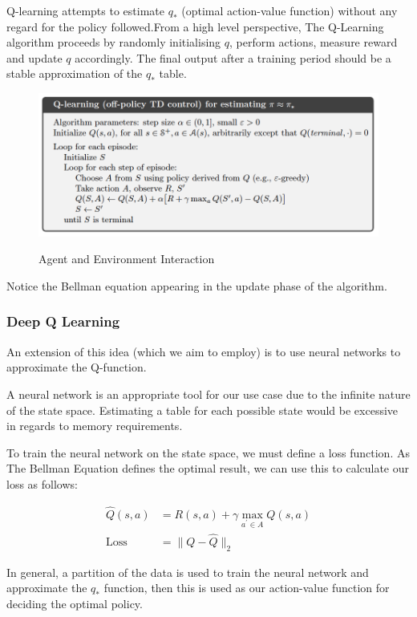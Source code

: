 \documentclass[12pt, authoryear]{elsarticle}
\begin{document}
Q-learning attempts to estimate $q_{*}$ (optimal action-value function) without any regard for the policy followed.From a high level perspective, The Q-Learning algorithm proceeds by randomly initialising $q$, perform actions, measure reward and update $q$ accordingly. The final output after a training period should be a stable approximation of the $q_{*}$ table.

\begin{figure}[h!]
	\centering
	\caption{Agent and Environment Interaction}
	\includegraphics[clip, angle=0, width=14cm]{figures/psudo_code.png}
	\label{fig:1}
\end{figure}

Notice the Bellman equation appearing in the update phase of the algorithm.

\subsubsection{Deep Q Learning}
An extension of this idea (which we aim to employ) is to use neural networks to approximate the Q-function.

A neural network is an appropriate tool for our use case due to the infinite nature of the state space. Estimating a table for each possible state would be excessive in regards to memory requirements.

To train the neural network on the state space, we must define a loss function. As The Bellman Equation defines the optimal result, we can use this to calculate our loss as follows:

$$
\begin{aligned}
\hat { Q } ( s , a ) &= R ( s , a ) + \gamma \max _ { a ^ { \prime } \in A } Q ( s , a ) \\
\text {Loss} &= \| Q - \hat { Q } \| _ { 2 }
\end{aligned}
$$

In general, a partition of the data is used to train the neural network and approximate the $q_{*}$ function, then this is used as our action-value function for deciding the optimal policy.
\end{document}
